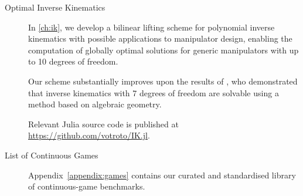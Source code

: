 \documentclass[../main.tex]{subfiles}
\begin{document}
\begin{description}
    \item[Optimal Inverse Kinematics \cite{votroubek24globallyoptimalik}] In \cref{ch:ik}, we develop a bilinear lifting scheme for polynomial inverse kinematics with possible applications to manipulator design, enabling the computation of globally optimal solutions for generic manipulators with up to 10 degrees of freedom.

    Our scheme substantially improves upon the results of \textcite{trutman2022globally}, who demonstrated that inverse kinematics with 7 degrees of freedom are solvable using a method based on algebraic geometry.

    Relevant Julia source code is published at \url{https://github.com/votroto/IK.jl}.

    \item[List of Continuous Games] Appendix~\ref{appendix:games} contains our curated and standardised library of continuous-game benchmarks.
\end{description}
\end{document}
